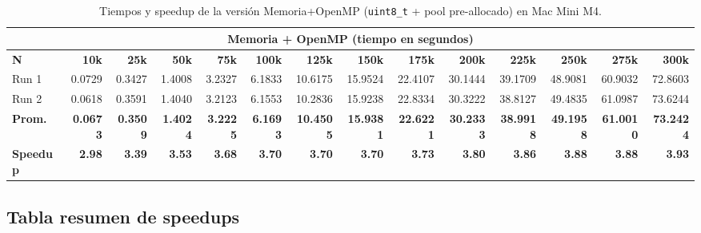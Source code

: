 \documentclass{article}
\begin{document}
\begin{table}[H]
\centering
\scriptsize
\begin{adjustbox}{max width=\textwidth}
\begin{tabular}{|l|r|r|r|r|r|r|r|r|r|r|r|r|r|}
\hline
\multicolumn{14}{|c|}{\textbf{Memoria + OpenMP (tiempo en segundos)}} \\
\hline
\textbf{N} & \textbf{10k} & \textbf{25k} & \textbf{50k} & \textbf{75k} & \textbf{100k}
           & \textbf{125k} & \textbf{150k} & \textbf{175k} & \textbf{200k}
           & \textbf{225k} & \textbf{250k} & \textbf{275k} & \textbf{300k} \\
\hline
Run 1
  & 0.0729 & 0.3427 & 1.4008 & 3.2327 & 6.1833
  & 10.6175 & 15.9524 & 22.4107 & 30.1444
  & 39.1709 & 48.9081 & 60.9032 & 72.8603 \\
Run 2
  & 0.0618 & 0.3591 & 1.4040 & 3.2123 & 6.1553
  & 10.2836 & 15.9238 & 22.8334 & 30.3222
  & 38.8127 & 49.4835 & 61.0987 & 73.6244 \\
\hline
\textbf{Prom.}
  & \textbf{0.0673} & \textbf{0.3509} & \textbf{1.4024} & \textbf{3.2225}
  & \textbf{6.1693} & \textbf{10.4505} & \textbf{15.9381} & \textbf{22.6221}
  & \textbf{30.2333} & \textbf{38.9918} & \textbf{49.1958}
  & \textbf{61.0010} & \textbf{73.2424} \\
\hline
\textbf{Speedup}
  & \textbf{2.98} & \textbf{3.39} & \textbf{3.53} & \textbf{3.68}
  & \textbf{3.70} & \textbf{3.70} & \textbf{3.70} & \textbf{3.73}
  & \textbf{3.80} & \textbf{3.86} & \textbf{3.88}
  & \textbf{3.88} & \textbf{3.93} \\
\hline
\end{tabular}
\end{adjustbox}
\caption{Tiempos y speedup de la versi\'on Memoria+OpenMP (\texttt{uint8\_t} + pool
         pre-allocado) en Mac Mini M4.}
\label{tab:mem}
\end{table}

\subsection{Tabla resumen de speedups}
\end{document}
